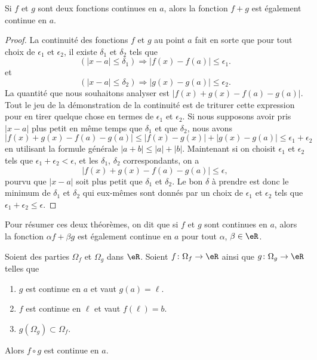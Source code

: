 \begin{theorem}
	Si $f$ et $g$ sont deux fonctions continues en $a$, alors la fonction $f+g$ est également continue en $a$.
\end{theorem}

\begin{proof}
	La continuité des fonctions $f$ et $g$ au point $a$ fait en sorte que pour tout choix de $\epsilon_1$ et $\epsilon_2$, il existe $\delta_1$ et $\delta_2$ tels que
	\[
		(| x-a |\leq \delta_1)\Rightarrow | f(x)-f(a) |\leq \epsilon_1.
	\]
	et
	\[
		(| x-a |\leq \delta_2)\Rightarrow | g(x)-g(a) |\leq \epsilon_2.
	\]
	La quantité que nous souhaitons analyser est $| f(x)+g(x)-f(a)-g(a) |$. Tout le jeu de la démonstration de la continuité est de triturer cette expression pour en tirer quelque chose en termes de $\epsilon_1$ et $\epsilon_2$. Si nous supposons avoir pris $| x-a |$ plus petit en même temps que $\delta_1$ et que $\delta_2$, nous avons
	\[
		| f(x)+g(x)-f(a)-g(a) |\leq| f(x)-g(x) |+| g(x)-g(a) |\leq\epsilon_1+\epsilon_2
	\]
	en utilisant la formule générale $| a+b |\leq | a |+| b |$. Maintenant si on choisit $\epsilon_1$ et $\epsilon_2$ tels que $\epsilon_1+\epsilon_2<\epsilon$, et les $\delta_1$, $\delta_2$ correspondants, on a
	\[
		| f(x)+g(x)-f(a)-g(a) |\leq\epsilon,
	\]
	pourvu que $| x-a |$ soit plus petit que $\delta_1$ et $\delta_2$. Le bon $\delta$ à prendre est donc le minimum de $\delta_1$ et $\delta_2$ qui eux-mêmes sont donnés par un choix de $\epsilon_1$ et $\epsilon_2$ tels que $\epsilon_1+\epsilon_2\leq\epsilon$.
\end{proof}

Pour résumer ces deux théorèmes, on dit que si $f$ et $g$ sont continues en $a$, alors la fonction $\alpha f+\beta g$ est également continue en $a$ pour tout $\alpha$, $\beta\in\eR$.

\begin{proposition}     \label{PROPooVNKVooJvxarf}
	Soient des parties \( \Omega_f\) et \( \Omega_g\) dans \( \eR\). Soient \( f\colon \Omega_f\to \eR\) ainsi que \( g\colon \Omega_g\to \eR\) telles que
	\begin{enumerate}
		\item
		      \( g\) est continue en \( a\) et vaut \( g(a)=\ell\).
		\item
		      \( f\) est continue en \( \ell\) et vaut \( f(\ell)=b\).
		\item
		      \( g(\Omega_g)\subset \Omega_f\).
	\end{enumerate}
	Alors \( f\circ g\) est continue en \( a\).
\end{proposition}

